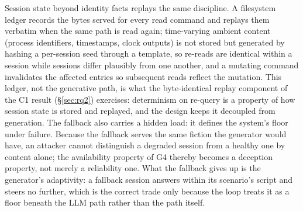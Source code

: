 Session state beyond identity facts replays the same discipline. A
filesystem ledger records the bytes served for every read command and
replays them verbatim when the same path is read again; time-varying
ambient content (process identifiers, timestamps, clock outputs) is not
stored but generated by hashing a per-session seed through a template,
so re-reads are identical within a session while sessions differ
plausibly from one another, and a mutating command invalidates the
affected entries so subsequent reads reflect the mutation. This ledger,
not the generative path, is what the byte-identical replay component of
the C1 result (\S\ref{sec:rq2}) exercises: determinism on re-query is a
property of how session state is stored and replayed, and the design
keeps it decoupled from generation.
The fallback also carries a hidden load: it defines the system's floor
under failure. Because the fallback serves the same fiction the generator
would have, an attacker cannot distinguish a degraded session from a
healthy one by content alone; the availability
property of G4 thereby becomes a deception property, not merely a reliability one.
What the fallback gives up is the generator's adaptivity: a fallback
session answers within its scenario's script and steers no further,
which is the correct trade only because the loop treats it as a floor
beneath the LLM path rather than the path itself.
